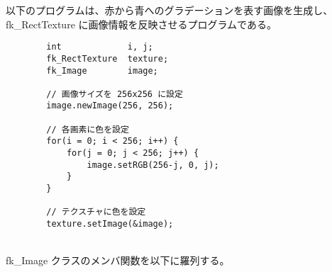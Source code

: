 以下のプログラムは、赤から青へのグラデーションを表す画像を生成し、
fk\_RectTexture に画像情報を反映させるプログラムである。
\\
\begin{breakbox}
\begin{verbatim}
        int             i, j;
        fk_RectTexture  texture;
        fk_Image        image;

        // 画像サイズを 256x256 に設定
        image.newImage(256, 256);

        // 各画素に色を設定
        for(i = 0; i < 256; i++) {
            for(j = 0; j < 256; j++) {
                image.setRGB(256-j, 0, j);
            }
        }

        // テクスチャに色を設定
        texture.setImage(&image);
\end{verbatim}
\end{breakbox}
~ \\
fk\_Image クラスのメンバ関数を以下に羅列する。
